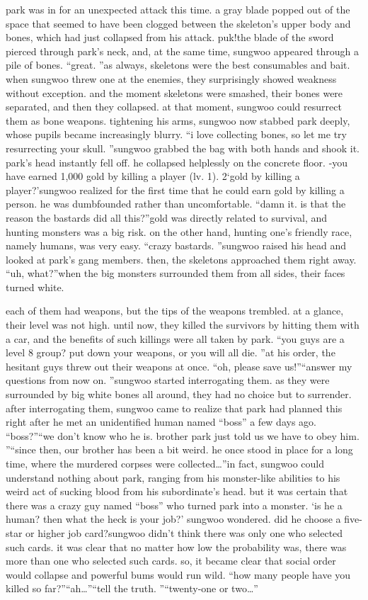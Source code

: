  park was in for an unexpected attack this time.
 a gray blade popped out of the space that seemed to have been clogged between the skeleton’s upper body and bones, which had just collapsed from his attack.
puk!the blade of the sword pierced through park’s neck, and, at the same time, sungwoo appeared through a pile of bones.
“great.
”as always, skeletons were the best consumables and bait.
when sungwoo threw one at the enemies, they surprisingly showed weakness without exception.
 and the moment skeletons were smashed, their bones were separated, and then they collapsed.
at that moment, sungwoo could resurrect them as bone weapons.
tightening his arms, sungwoo now stabbed park deeply, whose pupils became increasingly blurry.
“i love collecting bones, so let me try resurrecting your skull.
”sungwoo grabbed the bag with both hands and shook it.
park’s head instantly fell off.
 he collapsed helplessly on the concrete floor.
-you have earned 1,000 gold by killing a player (lv.
 1).
2‘gold by killing a player?’sungwoo realized for the first time that he could earn gold by killing a person.
he was dumbfounded rather than uncomfortable.
“damn it.
 is that the reason the bastards did all this?”gold was directly related to survival, and hunting monsters was a big risk.
on the other hand, hunting one’s friendly race, namely humans, was very easy.
“crazy bastards.
”sungwoo raised his head and looked at park’s gang members.
 then, the skeletons approached them right away.
“uh, what?”when the big monsters surrounded them from all sides, their faces turned white.


each of them had weapons, but the tips of the weapons trembled.
at a glance, their level was not high.
 until now, they killed the survivors by hitting them with a car, and the benefits of such killings were all taken by park.
“you guys are a level 8 group? put down your weapons, or you will all die.
”at his order, the hesitant guys threw out their weapons at once.
“oh, please save us!”“answer my questions from now on.
”sungwoo started interrogating them.
 as they were surrounded by big white bones all around, they had no choice but to surrender.
after interrogating them, sungwoo came to realize that park had planned this right after he met an unidentified human named “boss” a few days ago.
“boss?”“we don’t know who he is.
 brother park just told us we have to obey him.
”“since then, our brother has been a bit weird.
 he once stood in place for a long time, where the murdered corpses were collected…”in fact, sungwoo could understand nothing about park, ranging from his monster-like abilities to his weird act of sucking blood from his subordinate’s head.
but it was certain that there was a crazy guy named “boss” who turned park into a monster.
‘is he a human? then what the heck is your job?’ sungwoo wondered.
did he choose a five-star or higher job card?sungwoo didn’t think there was only one who selected such cards.
it was clear that no matter how low the probability was, there was more than one who selected such cards.
 so, it became clear that social order would collapse and powerful bums would run wild.
“how many people have you killed so far?”“ah…”“tell the truth.
”“twenty-one or two…”

 